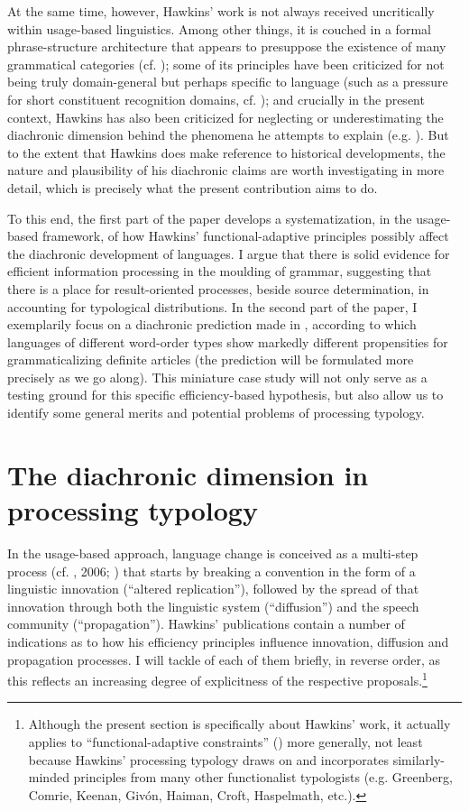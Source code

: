 \documentclass[output=paper]{langsci/langscibook}
\begin{document}
At the same time, however, Hawkins’ work is not always received uncritically within usage-based linguistics. Among other things, it is couched in a formal phrase-structure architecture that appears to presuppose the existence of many grammatical categories (cf. \citealt{Diessel2016}); some of its principles have been criticized for not being truly domain-general but perhaps specific to language (such as a pressure for short constituent recognition domains, cf. \citealt{Bybee2010}); and crucially in the present context, Hawkins has also been criticized for neglecting or underestimating the diachronic dimension behind the phenomena he attempts to explain (e.g. \citealt{Cristofaro2017,Collins2019tv}). But to the extent that Hawkins does make reference to historical developments, the nature and plausibility of his diachronic claims are worth investigating in more detail, which is precisely what the present contribution aims to do. 

To this end, the first part of the paper develops a systematization, in the usage-based framework, of how Hawkins’ functional-adaptive principles possibly affect the diachronic development of languages. I argue that there is solid evidence for efficient information processing in the moulding of grammar, suggesting that there is a place for result-oriented processes, beside source determination, in accounting for typological distributions. In the second part of the paper, I exemplarily focus on a diachronic prediction made in \citet{Hawkins2014}, according to which languages of different word-order types show markedly different propensities for grammaticalizing definite articles (the prediction will be formulated more precisely as we go along). This miniature case study will not only serve as a testing ground for this specific efficiency-based hypothesis, but also allow us to identify some general merits and potential problems of processing typology.

\section{ The diachronic dimension in processing typology} 

In the usage-based approach, language change is conceived as a multi-step process (cf. \citealt{Croft2000}, 2006; \citealt{Aitchison2013}) that starts by breaking a convention in the form of a linguistic innovation (“altered replication”), followed by the spread of that innovation through both the linguistic system (“diffusion”) and the speech community (“propagation”). Hawkins’ publications contain a number of indications as to how his efficiency principles influence innovation, diffusion and propagation processes. I will tackle of each of them briefly, in reverse order, as this reflects an increasing degree of explicitness of the respective proposals.\footnote{Although the present section is specifically about Hawkins’ work, it actually applies to “functional-adaptive constraints” (\citealt{Haspelmath2019tv}) more generally, not least because Hawkins’ processing typology draws on and incorporates similarly-minded principles from many other functionalist typologists (e.g. Greenberg, Comrie, Keenan, Givón, Haiman, Croft, Haspelmath, etc.).}
\end{document}
